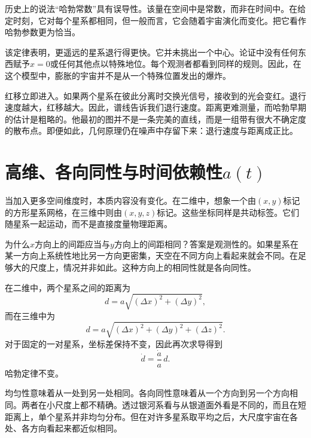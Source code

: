 历史上的说法``哈勃常数''具有误导性。该量在空间中是常数，而非在时间中。在给定时刻，它对每个星系都相同，但一般而言，它会随着宇宙演化而变化。把它看作哈勃参数更为恰当。

该定律表明，更遥远的星系退行得更快。它并未挑出一个中心。论证中没有任何东西赋予\(x=0\)或任何其他点以特殊地位。每个观测者都看到同样的规则。因此，在这个模型中，膨胀的宇宙并不是从一个特殊位置发出的爆炸。

红移立即进入。如果两个星系在彼此分离时交换光信号，接收到的光会变红。退行速度越大，红移越大。因此，谱线告诉我们退行速度。距离更难测量，而哈勃早期的估计是粗略的。他最初的图并不是一条完美的直线，而是一组带有很大不确定度的散布点。即便如此，几何原理仍在噪声中存留下来：退行速度与距离成正比。

\begin{classroomqa}
\end{classroomqa}

\section{高维、各向同性与时间依赖性\(a(t)\)}

当加入更多空间维度时，本质内容没有变化。在二维中，想象一个由\((x,y)\)标记的方形星系网格，在三维中则由\((x,y,z)\)标记。这些坐标同样是共动标签。它们随星系一起运动，而不是直接度量物理距离。

为什么\(x\)方向上的间距应当与\(y\)方向上的间距相同？答案是观测性的。如果星系在某一方向上系统性地比另一方向更密集，天空在不同方向上看起来就会不同。在足够大的尺度上，情况并非如此。这种方向上的相同性就是各向同性。

在二维中，两个星系之间的距离为
\begin{equation}
d=a\sqrt{(\Delta x)^2+(\Delta y)^2},
\end{equation}
而在三维中为
\begin{equation}
d=a\sqrt{(\Delta x)^2+(\Delta y)^2+(\Delta z)^2}.
\end{equation}
对于固定的一对星系，坐标差保持不变，因此再次求导得到
\begin{equation}
\dot d=\frac{\dot a}{a}\,d.
\end{equation}
哈勃定律不变。

均匀性意味着从一处到另一处相同。各向同性意味着从一个方向到另一个方向相同。两者在小尺度上都不精确。透过银河系看与从银道面外看是不同的，而且在短距离上，单个星系并非均匀分布。但在对许多星系取平均之后，大尺度宇宙在各处、各方向看起来都近似相同。

